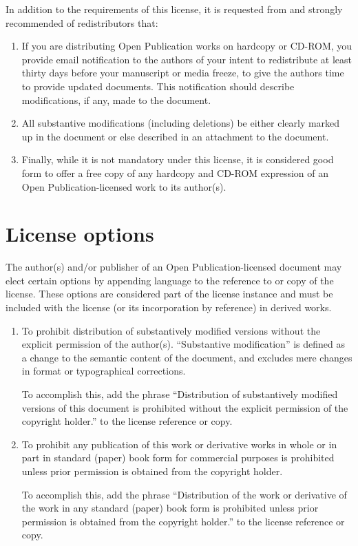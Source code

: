 In addition to the requirements of this license, it is requested from
and strongly recommended of redistributors that:

\begin{enumerate}
\item If you are distributing Open Publication works on hardcopy or
  CD-ROM, you provide email notification to the authors of your intent
  to redistribute at least thirty days before your manuscript or media
  freeze, to give the authors time to provide updated documents. This
  notification should describe modifications, if any, made to the
  document.
\item All substantive modifications (including deletions) be either
  clearly marked up in the document or else described in an attachment
  to the document.
\item Finally, while it is not mandatory under this license, it is
  considered good form to offer a free copy of any hardcopy and CD-ROM
  expression of an Open Publication-licensed work to its author(s).
\end{enumerate}

\section{License options}
\label{sec:opl:options}

The author(s) and/or publisher of an Open Publication-licensed
document may elect certain options by appending language to the
reference to or copy of the license. These options are considered part
of the license instance and must be included with the license (or its
incorporation by reference) in derived works.

\begin{enumerate}[A]
\item To prohibit distribution of substantively modified versions
  without the explicit permission of the author(s). ``Substantive
  modification'' is defined as a change to the semantic content of the
  document, and excludes mere changes in format or typographical
  corrections.

  To accomplish this, add the phrase ``Distribution of substantively
  modified versions of this document is prohibited without the
  explicit permission of the copyright holder.'' to the license
  reference or copy.

\item To prohibit any publication of this work or derivative works in
  whole or in part in standard (paper) book form for commercial
  purposes is prohibited unless prior permission is obtained from the
  copyright holder.

  To accomplish this, add the phrase ``Distribution of the work or
  derivative of the work in any standard (paper) book form is
  prohibited unless prior permission is obtained from the copyright
  holder.'' to the license reference or copy.
\end{enumerate}

